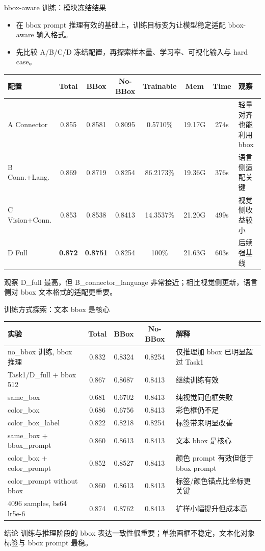 \documentclass{beamer}
\newcommand{\smalltab}{\scriptsize}
\begin{document}
\begin{frame}{bbox-aware 训练：模块冻结结果}
\small
\begin{itemize}
\item 在 bbox prompt 推理有效的基础上，训练目标变为让模型稳定适配 bbox-aware 输入格式。
\item 先比较 A/B/C/D 冻结配置，再探索样本量、学习率、可视化输入与 hard case。
\end{itemize}
\smalltab
\begin{tabular}{p{}ccccccp{}}
\toprule
配置 & Total & BBox & No-BBox & Trainable & Mem & Time & 观察 \\
\midrule
A Connector & 0.855 & 0.8581 & 0.8095 & 0.5710\% & 19.17G & 274s & 轻量对齐也能利用 bbox \\
B Conn.+Lang. & 0.869 & 0.8719 & 0.8254 & 86.2173\% & 19.36G & 376s & 语言侧适配关键 \\
C Vision+Conn. & 0.853 & 0.8538 & 0.8413 & 14.3537\% & 21.20G & 499s & 视觉侧收益较小 \\
D Full & \textbf{0.872} & \textbf{0.8751} & 0.8254 & 100\% & 21.63G & 603s & 后续强基线 \\
\bottomrule
\end{tabular}
\vspace{0.3em}
\begin{block}{观察}
D\_full 最高，但 B\_connector\_language 非常接近；相比视觉侧更新，语言侧对 bbox 文本格式的适配更重要。
\end{block}
\end{frame}

\begin{frame}{训练方式探索：文本 bbox 是核心}
\small
\scriptsize
\begin{tabular}{p{}cccp{}}
\toprule
实验 & Total & BBox & No-BBox & 解释 \\
\midrule
no\_bbox 训练, bbox 推理 & 0.832 & 0.8324 & 0.8254 & 仅推理加 bbox 已明显超过 Task1 \\
Task1/D\_full + bbox 512 & 0.867 & 0.8687 & 0.8413 & 继续训练有效 \\
same\_box & 0.681 & 0.6702 & 0.8413 & 纯视觉同色框失败 \\
color\_box & 0.686 & 0.6756 & 0.8413 & 彩色框仍不足 \\
color\_box\_label & 0.822 & 0.8218 & 0.8254 & 标签带来明显改善 \\
same\_box + bbox\_prompt & 0.860 & 0.8613 & 0.8413 & 文本 bbox 是核心 \\
color\_box + color\_prompt & 0.852 & 0.8527 & 0.8413 & 颜色 prompt 有效但低于 bbox prompt \\
color\_prompt without bbox & 0.860 & 0.8613 & 0.8413 & 标签/颜色锚点比坐标更关键 \\
4096 samples, bs64 lr5e-6 & 0.874 & 0.8762 & 0.8413 & 扩样小幅提升但成本高 \\
\bottomrule
\end{tabular}
\vspace{0.4em}
\begin{block}{结论}
训练与推理阶段的 bbox 表达一致性很重要；单独画框不稳定，文本化对象标签与 bbox prompt 最稳。
\end{block}
\end{frame}
\end{document}
